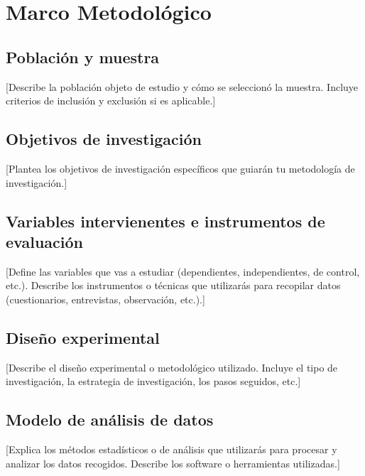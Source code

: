 \chapter{Marco Metodológico}

\section{Población y muestra}

[Describe la población objeto de estudio y cómo se seleccionó la muestra. Incluye criterios de
inclusión y exclusión si es aplicable.]

\section{Objetivos de investigación}

[Plantea los objetivos de investigación específicos que guiarán tu metodología de investigación.]

\section{Variables intervienentes e instrumentos de evaluación}

[Define las variables que vas a estudiar (dependientes, independientes, de control, etc.).
Describe los instrumentos o técnicas que utilizarás para recopilar datos (cuestionarios,
entrevistas, observación, etc.).]

\section{Diseño experimental}

[Describe el diseño experimental o metodológico utilizado. Incluye el tipo de investigación,
la estrategia de investigación, los pasos seguidos, etc.]

\section{Modelo de análisis de datos}

[Explica los métodos estadísticos o de análisis que utilizarás para procesar y analizar los datos
recogidos. Describe los software o herramientas utilizadas.]

